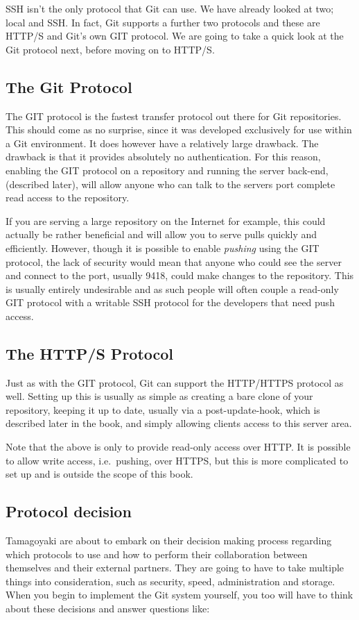 SSH isn't the only protocol that Git can use.
We have already looked at two; local and SSH.
In fact, Git supports a further two protocols and these are HTTP/S and Git's own GIT protocol.
We are going to take a quick look at the Git protocol next, before moving on to HTTP/S.

\subsection{The Git Protocol}
The GIT protocol is the fastest transfer protocol out there for Git repositories.
This should come as no surprise, since it was developed exclusively for use within a Git environment.
It does however have a relatively large drawback.
The drawback is that it provides absolutely no authentication.
For this reason, enabling the GIT protocol on a repository and running the server back-end, (described later), will allow anyone who can talk to the servers port complete read access to the repository.

If you are serving a large repository on the Internet for example, this could actually be rather beneficial and will allow you to serve pulls quickly and efficiently.
However, though it is possible to enable \emph{pushing} using the GIT protocol, the lack of security would mean that anyone who could see the server and connect to the port, usually 9418, could make changes to the repository.
This is usually entirely undesirable and as such people will often couple a read-only GIT protocol with a writable SSH protocol for the developers that need push access.

\subsection{The HTTP/S Protocol}
Just as with the GIT protocol, Git can support the HTTP/HTTPS protocol as well.
Setting up this is usually as simple as creating a bare clone of your repository, keeping it up to date, usually via a post-update-hook, which is described later in the book, and simply allowing clients access to this server area.

Note that the above is only to provide read-only access over HTTP.
It is possible to allow write access, i.e.\ pushing, over HTTPS, but this is more complicated to set up and is outside the scope of this book.

\subsection{Protocol decision}
Tamagoyaki are about to embark on their decision making process regarding which protocols to use and how to perform their collaboration between themselves and their external partners.
They are going to have to take multiple things into consideration, such as security, speed, administration and storage.
When you begin to implement the Git system yourself, you too will have to think about these decisions and answer questions like:

